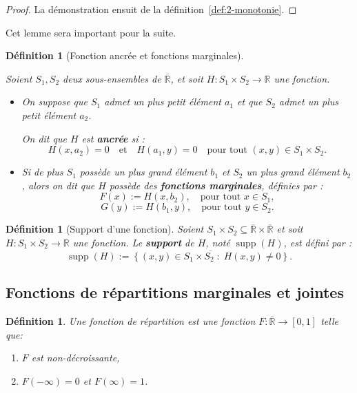 \documentclass[a4paper,11pt]{amsbook}
\numberwithin{equation}{chapter}
\newtheorem{definition}	[theoreme]   {Définition}
\theoremstyle{definition}
\begin{document}
\begin{proof}
La démonstration ensuit de la définition~\ref{def:2-monotonie}.
\end{proof}
Cet lemme sera important pour la suite.

\begin{definition}[Fonction ancrée et fonctions marginales]\label{def:fonc_ancree_marginales}

Soient \( S_1, S_2 \) deux sous-ensembles de \( \overline{\mathbb{R}} \), et soit \( H : S_1 \times S_2 \to \mathbb{R} \) une fonction.

\begin{itemize}
  \item On suppose que \( S_1 \) admet un plus petit élément \( a_1 \) et que \( S_2 \) admet un plus petit élément \( a_2 \).  
  
  On dit que \( H \) est \textbf{ancrée} si :
  \[
  H(x, a_2) = 0 \quad \text{et} \quad H(a_1, y) = 0 \quad \text{pour tout } (x, y) \in S_1 \times S_2.
  \]
  
  \item Si de plus \( S_1 \) possède un plus grand élément \( b_1 \) et \( S_2 \) un plus grand élément \( b_2 \), alors on dit que \( H \) possède des \textbf{fonctions marginales}, définies par :
  \[
  F(x) := H(x, b_2), \quad \text{pour tout } x \in S_1,
  \]
  \[
  G(y) := H(b_1, y), \quad \text{pour tout } y \in S_2.
  \]
\end{itemize}
\end{definition}

\begin{definition}[Support d'une fonction]\label{def:supp}
Soient \( S_1 \times S_2 \subseteq \overline{\mathbb{R}} \times \overline{\mathbb{R}} \) et soit \( H : S_1 \times S_2 \to \mathbb{R} \) une fonction. Le \textbf{support} de \( H \), noté \( \operatorname{supp}(H) \), est défini par :
\[
\operatorname{supp}(H) := \overline{\left\{ (x, y) \in S_1 \times S_2 \;:\; H(x, y) \neq 0 \right\}}.
\]
\end{definition}

\subsection{Fonctions de répartitions marginales et jointes}

\begin{definition}\label{def:fonc_rep_uni}
Une fonction de répartition est une fonction \( F : \overline{\mathbb{R}} \to [0,1] \) telle que:
\begin{enumerate}
    \item \( F \) est non-décroissante,
    \item \( F(-\infty) = 0 \) et \( F(\infty) = 1 \).
\end{enumerate}
\end{definition}
\end{document}
